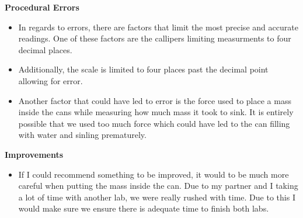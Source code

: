 \documentclass{report}
\begin{document}
    \noindent \textbf{Procedural Errors}
    \begin{itemize}
      \item In regards to errors, there are factors that limit the most precise and 
            accurate readings. One of these factors are the callipers limiting measurments
            to four decimal places.
      \item Additionally, the scale is limited to four places past the decimal point
            allowing for error.
      \item Another factor that could have led to error is the force used to place a mass
            inside the cans while measuring how much mass it took to sink. It is entirely
            possible that we used too much force which could have led to the can filling with water
            and sinling prematurely.
    \end{itemize}

    \noindent \textbf{Improvements}
    \begin{itemize}
      \item If I could recommend something to be improved, it would to be much more
            careful when putting the mass inside the can. Due to my partner and I taking
            a lot of time with another lab, we were really rushed with time. Due to this
            I would make sure we ensure there is adequate time to finish both labs.
    \end{itemize}
\end{document}
